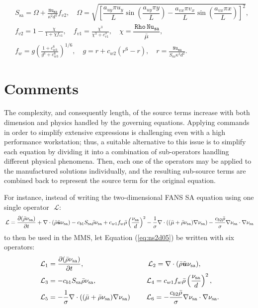 \documentclass[10pt]{article}
\newcommand{\Diff}[2] {\dfrac{\partial( #1)}{\partial #2}}
\newcommand{\bv}[1]{\ensuremath{\mbox{\boldmath$ #1 $}}}
\newcommand{\Rho}{\,\mathtt{Rho}}
\newcommand{\Nu}{\,\mathtt{Nu_{sa}}}
\newcommand{\Lo}{\,\mathcal{L}}
\newcommand{\sa}{\nu_{\mathrm{sa}}}
\newcommand{\tsa}{\mathrm{sa}}
\newcommand{\brho}{\bar{\rho}}
\newcommand{\bmu}{\bar{\mu}}
\begin{document}
\begin{equation}
 \begin{split}
&S_{\mathrm{sa}} = \Omega + \frac{\Nu}{\kappa^2 d^2} f_{v2}, \quad \Omega = \sqrt{\left[ \dfrac{a_{uy}\pi u_y}{L}  \sin\left(\dfrac{a_{uy} \pi y}{L}\right)- \dfrac{a_{vx}\pi v_x}{L}  \sin\left(\dfrac{a_{vx} \pi x}{L}\right)\right]^2}, \\
&f_{v2} = 1 - \frac{\chi}{1 + \chi f_{v1}}, \quad f_{v1} = \frac{\chi^3}{\chi^3 + c_{v1}^3}, \quad \chi = \dfrac{\Rho \Nu}{\bmu}, \\
&f_w = g \left( \frac{1 + c_{w3}^6}{g^6 + c_{w3}^6} \right)^{1/6}, \quad g = r + c_{w2} \left( r^6 - r \right), \quad r = \frac{\Nu}{S_{\mathrm{sa}} \kappa^2 d^2}.
 \end{split}
\end{equation}


\section{Comments}
The complexity, and consequently length, of the source terms increase with both dimension and physics handled by the governing equations. 
Applying commands in order to simplify extensive expressions is challenging even with a high performance workstation; thus, a suitable alternative to this issue is to simplify each equation by dividing it into a combination of sub-operators handling different physical phenomena. Then, each one of the operators may be applied to the manufactured solutions individually, and the resulting sub-source terms are combined back to represent the source term for the original equation.


For instance, instead of writing the two-dimensional FANS SA equation using one single operator~$\Lo$:
 \begin{equation} \label{eq:ns2d05}
\Lo=\Diff{\bar{\rho} \sa}{t} +\nabla \cdot (\bar{\rho} \tilde{\bv{u}} \sa) - c_{b1} S_\tsa \bar{\rho} \sa +c_{w1} f_w \brho \left(\dfrac{\sa}{d}\right)^2 - \dfrac{1}{\sigma}\nabla \cdot \left( (\bmu+\bar{\rho}  \sa) \nabla \sa\right) -\dfrac{c_{b2} \bar{\rho} }{\sigma} \nabla \sa \cdot \nabla \sa
\end{equation}
to then be used in the MMS, let Equation (\ref{eq:ns2d05}) be written with six operators:
\begin{equation}
 \begin{split}\label{sub01}
  \Lo_1&=\Diff{\bar{\rho} \sa}{t},\qquad\qquad\qquad\qquad\quad  \Lo_2=\nabla \cdot (\bar{\rho} \tilde{\bv{u}} \sa) ,\\
  \Lo_3&=- c_{b1} S_\tsa \bar{\rho} \sa ,\quad\quad\quad \qquad\qquad\Lo_4=c_{w1} f_w \brho \left(\dfrac{\sa}{d}\right)^2 ,\\
  \Lo_5&=- \dfrac{1}{\sigma}\nabla \cdot \left( (\bmu+\bar{\rho}  \sa) \nabla \sa\right) \quad\quad  \Lo_6= -\dfrac{c_{b2} \bar{\rho} }{\sigma} \nabla \sa \cdot \nabla \sa.
 \end{split}
\end{equation}
\end{document}
